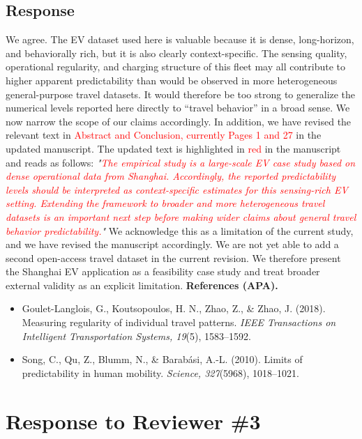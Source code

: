 \documentclass{NSF}
\begin{document}
\subsection{Response}
We agree. The EV dataset used here is valuable because it is dense, long-horizon, and behaviorally rich, but it is also clearly context-specific. The sensing quality, operational regularity, and charging structure of this fleet may all contribute to higher apparent predictability than would be observed in more heterogeneous general-purpose travel datasets. It would therefore be too strong to generalize the numerical levels reported here directly to ``travel behavior'' in a broad sense. We now narrow the scope of our claims accordingly.
\noindent In addition, we have revised the relevant text in \textcolor{red}{Abstract and Conclusion, currently Pages 1 and 27} in the updated manuscript. The updated text is highlighted in \textcolor{red}{red} in the manuscript and reads as follows:
\vskip 0.1cm
\noindent \textit{"\textcolor{red}{The empirical study is a large-scale EV case study based on dense operational data from Shanghai. Accordingly, the reported predictability levels should be interpreted as context-specific estimates for this sensing-rich EV setting. Extending the framework to broader and more heterogeneous travel datasets is an important next step before making wider claims about general travel behavior predictability.}"}
\vskip 0.05in
\noindent We acknowledge this as a limitation of the current study, and we have revised the manuscript accordingly. We are not yet able to add a second open-access travel dataset in the current revision. We therefore present the Shanghai EV application as a feasibility case study and treat broader external validity as an explicit limitation.
\vskip 0.05in
\noindent\textbf{References (APA).}
\begin{itemize}
    \item Goulet-Langlois, G., Koutsopoulos, H. N., Zhao, Z., \& Zhao, J. (2018). Measuring regularity of individual travel patterns. \textit{IEEE Transactions on Intelligent Transportation Systems, 19}(5), 1583--1592.
    \item Song, C., Qu, Z., Blumm, N., \& Barab\'asi, A.-L. (2010). Limits of predictability in human mobility. \textit{Science, 327}(5968), 1018--1021.
\end{itemize}

\newpage
\section{Response to Reviewer \#3}
\end{document}
